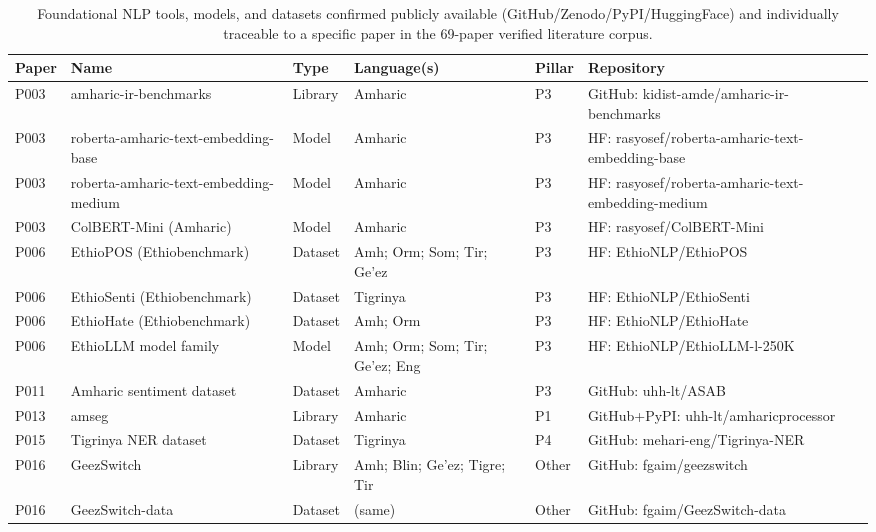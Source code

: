 \documentclass[sn-mathphys-num]{sn-jnl}
\theoremstyle{thmstyleone}
\theoremstyle{thmstyletwo}
\theoremstyle{thmstylethree}
\begin{document}
\begin{table}
\caption{Foundational NLP tools, models, and datasets confirmed publicly available (GitHub/Zenodo/PyPI/HuggingFace) and individually traceable to a specific paper in the 69-paper verified literature corpus.}\label{table:tools-from-corpus}
\begin{tabular}{@{}L{1.3cm}L{3.6cm}L{2.0cm}L{3.2cm}L{0.9cm}L{6.3cm}@{}}
\toprule
\textbf{Paper} & \textbf{Name} & \textbf{Type} & \textbf{Language(s)} & \textbf{Pillar} & \textbf{Repository} \\
\midrule
P003~\citep{mekonnen_optimized_2025} & amharic-ir-benchmarks & Library & Amharic & P3 & GitHub: kidist-amde/amharic-ir-benchmarks \\
P003~\citep{mekonnen_optimized_2025} & roberta-amharic-text-embedding-base & Model & Amharic & P3 & HF: rasyosef/roberta-amharic-text-embedding-base \\
P003~\citep{mekonnen_optimized_2025} & roberta-amharic-text-embedding-medium & Model & Amharic & P3 & HF: rasyosef/roberta-amharic-text-embedding-medium \\
P003~\citep{mekonnen_optimized_2025} & ColBERT-Mini (Amharic) & Model & Amharic & P3 & HF: rasyosef/ColBERT-Mini \\
P006~\citep{tonja_ethiollm_2024} & EthioPOS (Ethiobenchmark) & Dataset & Amh; Orm; Som; Tir; Ge'ez & P3 & HF: EthioNLP/EthioPOS \\
P006~\citep{tonja_ethiollm_2024} & EthioSenti (Ethiobenchmark) & Dataset & Tigrinya & P3 & HF: EthioNLP/EthioSenti \\
P006~\citep{tonja_ethiollm_2024} & EthioHate (Ethiobenchmark) & Dataset & Amh; Orm & P3 & HF: EthioNLP/EthioHate \\
P006~\citep{tonja_ethiollm_2024} & EthioLLM model family & Model & Amh; Orm; Som; Tir; Ge'ez; Eng & P3 & HF: EthioNLP/EthioLLM-l-250K \\
P011~\citep{yimam_exploring_2020} & Amharic sentiment dataset & Dataset & Amharic & P3 & GitHub: uhh-lt/ASAB \\
P013~\citep{yimam_introducing_2021} & amseg & Library & Amharic & P1 & GitHub+PyPI: uhh-lt/amharicprocessor \\
P015~\citep{yohannes_named-entity_2022} & Tigrinya NER dataset & Dataset & Tigrinya & P4 & GitHub: mehari-eng/Tigrinya-NER \\
P016~\citep{gaim_geezswitch_2022} & GeezSwitch & Library & Amh; Blin; Ge'ez; Tigre; Tir & Other & GitHub: fgaim/geezswitch \\
P016~\citep{gaim_geezswitch_2022} & GeezSwitch-data & Dataset & (same) & Other & GitHub: fgaim/GeezSwitch-data \\

\end{tabular}
\end{table}
\end{document}
